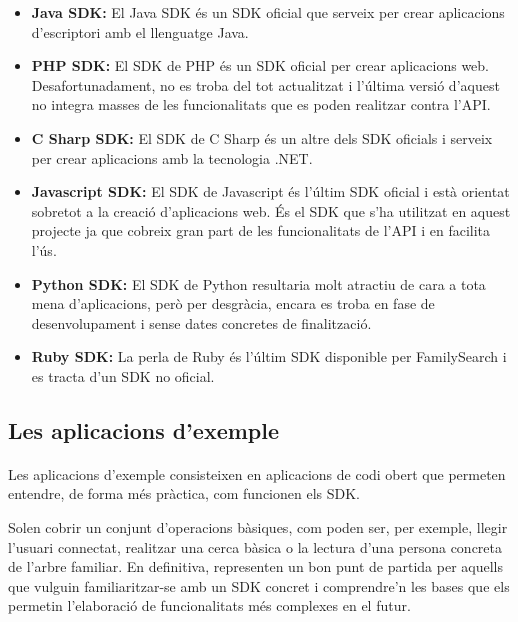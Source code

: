         \begin{itemize}
            \item \textbf{Java SDK:} El Java SDK és un SDK oficial que serveix per crear aplicacions d'escriptori amb el llenguatge Java.
            \item \textbf{PHP SDK:} El SDK de PHP és un SDK oficial per crear aplicacions web. Desafortunadament, no es troba del tot actualitzat i l'última versió d'aquest no integra masses de les funcionalitats que es poden realitzar contra l'API.
            \item \textbf{C Sharp SDK:} El SDK de C Sharp és un altre dels SDK oficials i serveix per crear aplicacions amb la tecnologia .NET.
            \item \textbf{Javascript SDK:} El SDK de Javascript és l'últim SDK oficial i està orientat sobretot a la creació d'aplicacions web. És el SDK que s'ha utilitzat en aquest projecte ja que cobreix gran part de les funcionalitats de l'API i en facilita l'ús.
            \item \textbf{Python SDK:} El SDK de Python resultaria molt atractiu de cara a tota mena d'aplicacions, però per desgràcia, encara es troba en fase de desenvolupament i sense dates concretes de finalització.
            \item \textbf{Ruby SDK:} La perla de Ruby és l'últim SDK disponible per FamilySearch i es tracta d'un SDK no oficial.
        \end{itemize}


    \subsection{Les aplicacions d'exemple}

        \paragraph{}
        Les aplicacions d'exemple consisteixen en aplicacions de codi obert que permeten entendre, de forma més pràctica, com funcionen els SDK.

        Solen cobrir un conjunt d'operacions bàsiques, com poden ser, per exemple, llegir l'usuari connectat, realitzar una cerca bàsica o la lectura d'una persona concreta de l'arbre familiar. En definitiva, representen un bon punt de partida per aquells que vulguin familiaritzar-se amb un SDK concret i comprendre'n les bases que els permetin l'elaboració de funcionalitats més complexes en el futur.


